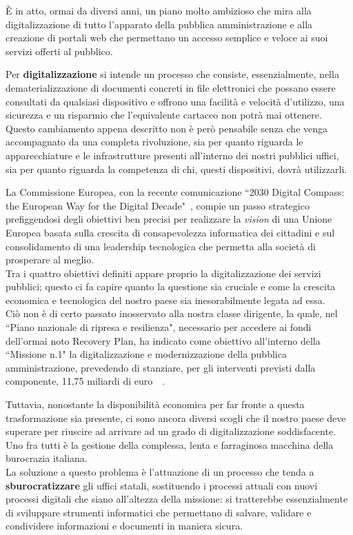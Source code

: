 È in atto, ormai da diversi anni, un piano molto ambizioso che mira alla digitalizzazione
di tutto l'apparato della pubblica amministrazione e alla creazione di portali web che
permettano un accesso semplice e veloce ai suoi servizi offerti al pubblico.

Per \textbf{digitalizzazione} si intende un processo che consiste, essenzialmente,
nella dematerializzazione di documenti concreti in file elettronici che possano essere
consultati da qualsiasi dispositivo e offrono una facilità e velocità d'utilizzo,
una sicurezza e un risparmio che l'equivalente cartaceo non potrà mai ottenere.
\\
Questo cambiamento appena descritto non è però pensabile senza che venga accompagnato
da una completa rivoluzione, sia per quanto riguarda le apparecchiature e le
infrastrutture presenti all'interno dei nostri pubblici uffici, sia per quanto
riguarda la competenza di chi, questi dispositivi, dovrà utilizzarli.

La Commissione Europea, con la recente comunicazione
``2030 Digital Compass: the European Way for the Digital Decade"~\cite{intro-1},
compie un passo strategico  prefiggendosi degli obiettivi ben precisi per realizzare
la \emph{vision} di una Unione Europea basata sulla crescita di consapevolezza informatica
dei cittadini e sul consolidamento di una leadership tecnologica che permetta
alla società di prosperare al meglio.
\\
Tra i quattro obiettivi definiti appare proprio la digitalizzazione dei servizi pubblici;
questo ci fa capire quanto la questione sia cruciale e come la crescita economica
e tecnologica del nostro paese sia inesorabilmente legata ad essa.
\\
Ciò non è di certo passato inosservato alla nostra classe dirigente,
la quale, nel ``Piano nazionale di ripresa e resilienza", necessario per accedere ai fondi
dell'ormai noto Recovery Plan, ha indicato come obiettivo all'interno della ``Missione n.1"
la digitalizzazione e modernizzazione della pubblica amministrazione, prevedendo di stanziare,
per gli interventi previsti dalla componente, 11,75 miliardi di euro~\cite{intro-2}~\cite{intro-3}.

Tuttavia, nonostante la disponibilità economica per far fronte a questa trasformazione
sia presente, ci sono ancora diversi scogli che il nostro paese deve superare per riuscire
ad arrivare ad un grado di digitalizzazione soddisfacente. Uno fra tutti è la gestione
della complessa, lenta e farraginosa macchina della burocrazia italiana.
\\
La soluzione a questo problema è l'attuazione di un processo che tenda a \textbf{sburocratizzare}
gli uffici statali, sostituendo i processi attuali con nuovi processi digitali che siano
all'altezza della missione: si tratterebbe essenzialmente di sviluppare strumenti informatici
che permettano di salvare, validare e condividere informazioni e documenti in maniera sicura.

